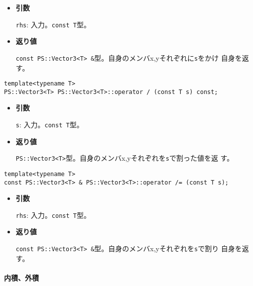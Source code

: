 \begin{itemize}

\item{{\bf 引数}}

{\tt rhs}: 入力。{\tt const T}型。

\item{{\bf 返り値}}

{\tt const PS::Vector3<T> \&}型。自身のメンバx,yそれぞれに{\tt s}をかけ
自身を返す。

\end{itemize}


\begin{screen}
\begin{verbatim}
template<typename T>
PS::Vector3<T> PS::Vector3<T>::operator / (const T s) const;
\end{verbatim}
\end{screen}

\begin{itemize}

\item{{\bf 引数}}

{\tt s}: 入力。{\tt const T}型。

\item{{\bf 返り値}}

{\tt PS::Vector3<T>}型。自身のメンバx,yそれぞれを{\tt s}で割った値を返
す。

\end{itemize}


\begin{screen}
\begin{verbatim}
template<typename T>
const PS::Vector3<T> & PS::Vector3<T>::operator /= (const T s);
\end{verbatim}
\end{screen}

\begin{itemize}

\item{{\bf 引数}}

{\tt rhs}: 入力。{\tt const T}型。

\item{{\bf 返り値}}

{\tt const PS::Vector3<T> \&}型。自身のメンバx,yそれぞれを{\tt s}で割り
自身を返す。

\end{itemize}


\paragraph{内積、外積}
\mbox{}

